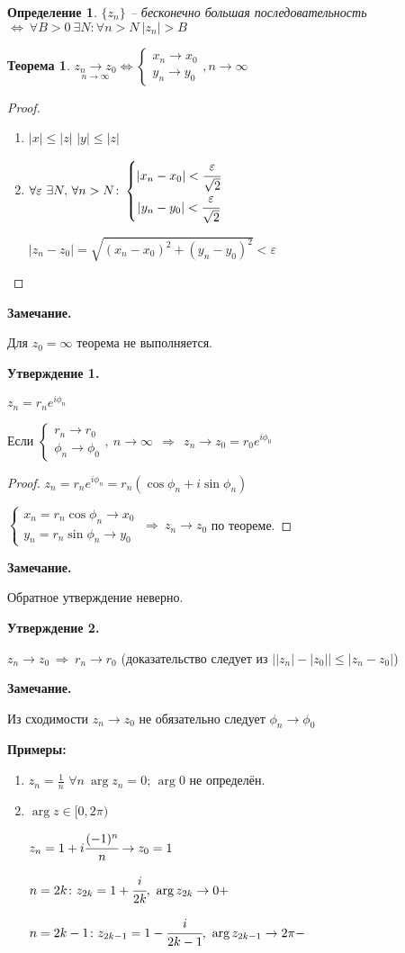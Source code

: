 \documentclass[final]{report}
\newcommand{\forcenewline}{$\phantom{\mbox{newline}}$\newline}
\newcommand{\then}{\ \Rightarrow\ }
\newcommand{\LRA}{\Leftrightarrow}
\newcommand{\ninf}[1]{\underset{n\to\infty}{#1}}
\renewcommand{\f}{\phi}
\newcommand{\e}{\varepsilon}
\newcommand{\sys}[1]{\left\{\begin{matrix}#1\end{matrix}\right.}
\newcommand{\opr}[1]{\begin{opred}#1\end{opred}}
\newtheorem*{theor}{Теорема}
\newtheorem*{opred}{Определение}
\theoremstyle{remark}
\begin{document}
\opr{$\{z_n\}$ -- бесконечно большая последовательность $\LRA\ \forall B>0\ \exists N\colon \forall n>N\ |z_n|>B$}

\begin{theor}
$\ninf{z_n\to z_0}\LRA\sys{x_n\to x_0 \\ y_n\to y_0},n\to\infty$
\end{theor}

\begin{proof}
\forcenewline
\begin{enumerate}
\item $|x|\leq|z|$
$|y|\leq|z|$
\item $\forall\e\ \exists N,\,\forall n>N\colon
\sys{|x_n-x_0|<\cfrac\e{\sqrt{2}} \\ |y_n-y_0|<\cfrac\e{\sqrt{2}}}$

$|z_n-z_0|=\sqrt{(x_n-x_0)^2+(y_n-y_0)^2}<\e$
\end{enumerate}
\end{proof}

{\bfseries Замечание.}

Для $z_0=\infty$ теорема не выполняется.

{\bfseries Утверждение 1.}

$z_n=r_ne^{i\f_n}$

Если $\sys{r_n\to r_0 \\ \f_n \to \f_0},\ n\to\infty\ \then\ z_n\to z_0=r_0e^{i\f_0}$

\begin{proof}
$z_n=r_ne^{i\f_n}=r_n(\cos\f_n+i\sin\f_n)$

$\sys{x_n=r_n\cos\f_n\to x_0 \\ y_n=r_n\sin\f_n\to y_0}\then z_n\to z_0$ по теореме.
\end{proof}

{\bfseries Замечание.}

Обратное утверждение неверно.

{\bfseries Утверждение 2.}

$z_n\to z_0\then r_n\to r_0$ (доказательство следует из $\bigl||z_n|-|z_0|\bigr|\leq|z_n-z_0|$)

{\bfseries Замечание.}

Из сходимости $z_n\to z_0$ не обязательно следует $\f_n\to\f_0$

{\bfseries Примеры:}
\begin{enumerate}
\item $z_n=\frac1n$ $\forall n\ \arg z_n=0$; $\arg 0$ не определён.
\item $\arg z\in[0,2\pi)$

$z_n=1+i\cfrac{(-1)^n}{n}\to z_0=1$

$n=2k\colon z_{2k}=1+\cfrac{i}{2k},\ \arg z_{2k}\to0+$

$n=2k-1\colon z_{2k-1}=1-\cfrac{i}{2k-1},\ \arg z_{2k-1}\to2\pi-$
\end{enumerate}
\end{document}

